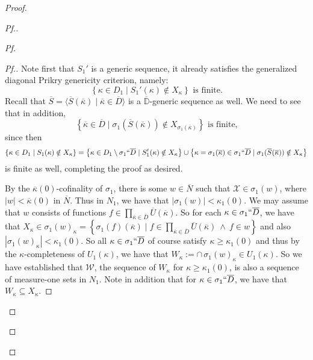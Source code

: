 \documentclass{amsart}
\theoremstyle{definition}
\theoremstyle{remark}
\newcommand{\D}{\mathbb{D}}
\newcommand{\N}{{\overline{N}}}
\renewcommand{\S}{{\overline{S}}}
\newcommand{\U}{\mathcal{U}}
\newcommand{\st}{\; | \;}
\newcommand{\set}[2]{\left\{#1\st #2 \right\}}
\newcommand{\seq}[2]{\langle #1 \st #2 \rangle}
\begin{document}
\begin{proof}
\begin{proof}[Pf.]
\begin{proof}[Pf]
\begin{proof}[Pf.]
Note first that $S_1'$ is a generic sequence, it already satisfies the generalized diagonal Prikry genericity criterion, namely:
$$\set{ \kappa \in D_1}{ S_1'(\kappa) \notin X_\kappa } \text{ is finite.}$$
Recall that $\S = \seq{ \S(\overline \kappa) }{ \overline \kappa \in \overline D }$ is a $\overline{\D}$-generic sequence as well.
We need to see that in addition,
$$\set{ \overline \kappa \in \overline D}{\sigma_1(\S(\overline \kappa)) \notin X_{\sigma_1(\overline \kappa)} }  \text{ is finite,}$$
since then 
$$\set{ \kappa \in D_1}{ S_1(\kappa) \notin X_\kappa } = \set{ \kappa \in D_1 \setminus \sigma_1``\overline D}{ S_1'(\kappa) \notin X_\kappa } \cup \set{ \kappa = \sigma_1(\overline \kappa) \in \sigma_1``\overline D}{\sigma_1(\S(\overline \kappa)) \notin X_\kappa }$$
is finite as well, completing the proof as desired.

By the $\overline{\kappa}(0)$-cofinality of $\sigma_1$, there is some $w \in \N$ such that $\mathcal X \in \sigma_1(w)$, where $|w| < \overline{\kappa}(0)$ in $\N$. Thus in $N_1$, we have that $|\sigma_1(w)| < \kappa_1(0)$. 
We may assume that $w$ consists of functions $f \in \prod_{\overline \kappa \in \overline D} \overline U(\overline \kappa)$.
So for each $\kappa \in \sigma_1``\overline D$, we have that $X_\kappa \in \sigma_1(w)_\kappa = \set{\sigma_1(f)(\overline \kappa) }{ f \in \prod_{\overline \kappa \in \overline D} \overline U(\overline \kappa) \ \land \ f \in w }$ and also $|\sigma_1(w)_\kappa|<\kappa_1(0).$ So all $\kappa \in \sigma_1``\overline D$ of course satisfy $\kappa \geq \kappa_1(0)$ and thus by the $\kappa$-completeness of $U_1(\kappa)$, we have that $W_\kappa := \cap \, \sigma_1(w)_\kappa \in  U_1(\kappa).$
So we have established that $\mathcal W$, the sequence of $W_\kappa$ for $\kappa \geq \kappa_1(0)$, is also a sequence of measure-one sets in $N_1$. Note in addition that for $\kappa \in \sigma_1``\overline D$, we have that $W_\kappa \subseteq X_\kappa$. 


\end{proof}
\end{proof}
\end{proof}
\end{proof}
\end{document}
